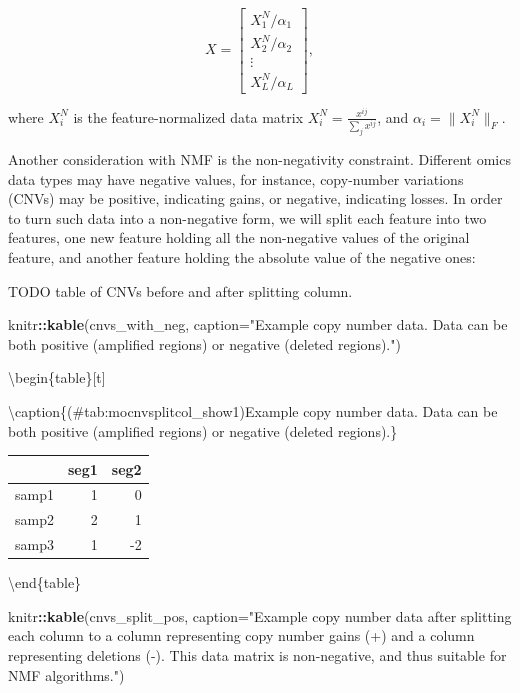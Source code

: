 \documentclass[12pt,]{krantz}
\newenvironment{Shaded}{\begin{snugshade}}{\end{snugshade}}
\newcommand{\DataTypeTok}[1]{\textcolor[rgb]{0.13,0.29,0.53}{#1}}
\newcommand{\KeywordTok}[1]{\textcolor[rgb]{0.13,0.29,0.53}{\textbf{#1}}}
\newcommand{\NormalTok}[1]{#1}
\newcommand{\OperatorTok}[1]{\textcolor[rgb]{0.81,0.36,0.00}{\textbf{#1}}}
\newcommand{\StringTok}[1]{\textcolor[rgb]{0.31,0.60,0.02}{#1}}
\begin{document}
\[
X = \begin{bmatrix}
    X_{1}^N / \alpha_1 \\
    X_{2}^N / \alpha_2 \\
    \vdots \\
    X_{L}^N / \alpha_L
\end{bmatrix},
\]

where \(X_i^N\) is the feature-normalized data matrix \(X_i^N = \frac{x^{ij}}{\sum_jx^{ij}}\), and \(\alpha_i = \|X_{i}^N\|_F\).

Another consideration with NMF is the non-negativity constraint. Different omics data types may have negative values, for instance, copy-number variations (CNVs) may be positive, indicating gains, or negative, indicating losses. In order to turn such data into a non-negative form, we will split each feature into two features, one new feature holding all the non-negative values of the original feature, and another feature holding the absolute value of the negative ones:

TODO table of CNVs before and after splitting column.

\begin{Shaded}
\begin{Highlighting}[]
\NormalTok{knitr}\OperatorTok{::}\KeywordTok{kable}\NormalTok{(cnvs_with_neg, }\DataTypeTok{caption=}\StringTok{"Example copy number data. Data can be both positive (amplified regions) or negative (deleted regions)."}\NormalTok{)}
\end{Highlighting}
\end{Shaded}

\textbackslash{}begin\{table\}{[}t{]}

\textbackslash{}caption\{(\#tab:mocnvsplitcol\_show1)Example copy number data. Data can be both positive (amplified regions) or negative (deleted regions).\}
\centering

\begin{tabular}{l|r|r}
\hline
  & seg1 & seg2\\
\hline
samp1 & 1 & 0\\
\hline
samp2 & 2 & 1\\
\hline
samp3 & 1 & -2\\
\hline
\end{tabular}

\textbackslash{}end\{table\}

\begin{Shaded}
\begin{Highlighting}[]
\NormalTok{knitr}\OperatorTok{::}\KeywordTok{kable}\NormalTok{(cnvs_split_pos, }\DataTypeTok{caption=}\StringTok{"Example copy number data after splitting each column to a column representing copy number gains (+) and a column representing deletions (-). This data matrix is non-negative, and thus suitable for NMF algorithms."}\NormalTok{)}
\end{Highlighting}
\end{Shaded}
\end{document}
